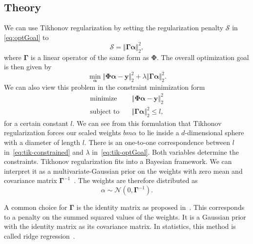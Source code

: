 \subsection{Theory}
We can use Tikhonov regularization by setting the regularization penalty
\(\mathcal{S}\) in \cref{eq:optGoal} to
\begin{equation}\label{eq:tik-langrangian}
\mathcal{S} = \Vert \bm{\Gamma} \bm{\alpha} \Vert_2^2,
\end{equation}
where \(\bm{\Gamma}\) is a linear operator of the same form as \(\bm{\Phi}\).
The overall optimization goal is then given by
\begin{equation}\label{eq:tik-optGoal}
 \min_{\bm{\alpha}} \Vert \bm{\Phi} \bm{\alpha} - \bm{y} \Vert_2^2 + \lambda \Vert \bm{\Gamma} \bm{\alpha} \Vert_2^2.
\end{equation}
We can also view this problem in the constraint minimization form
\begin{align}\label{eq:tik-constrained}
 \text{minimize} \quad &
 \left\Vert  \bm{\Phi} \bm{\alpha} - \bm{y}  \right\Vert_2^2 \nonumber \\
\text{subject to} \quad &  \Vert \bm{\Gamma} \bm{\alpha}  \Vert_2^2 \leq l,
\end{align}
for a certain constant \(l\). 
We can see from this formulation that Tikhonov regularization forces our scaled weights \(bm{\alpha}\) to lie inside a \(d\)-dimensional sphere with a diameter of length \(l\).
There is an one-to-one correspondence between \(l\) in~\cref{eq:tik-constrained} and \(\lambda\) in~\cref{eq:tik-optGoal}.
Both variables determine the constraints.
Tikhonov regularization fits into a Bayesian framework.
We can interpret it as a multivariate-Gaussian prior on the weights with zero mean and covariance matrix \(\bm{\Gamma}^{-1}\)~\cite{stat-inverse}.
The weights are therefore distributed as
\begin{equation}\label{eq:diagonal-prior}
\alpha \sim \mathcal{N} (0, \bm{\Gamma}^{-1}).
\end{equation}

A common choice for \(\bm{\Gamma}\) is the identity matrix as proposed in~\cite{spatAdaptGrid}.
This corresponds to a penalty on the summed squared values of the weights.
It is a Gaussian prior with the identity matrix as its covariance matrix.
In statistics, this method is called ridge regression~\cite{esl}.

